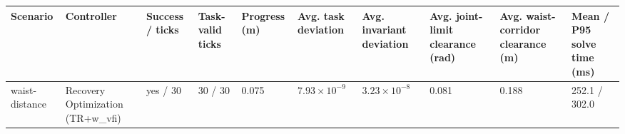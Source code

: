 \begin{tabular}{llllllllll}
\toprule
Scenario & Controller & Success / ticks & Task-valid ticks & Progress (m) & Avg. task deviation & Avg. invariant deviation & Avg. joint-limit clearance (rad) & Avg. waist-corridor clearance (m) & Mean / P95 solve time (ms) \\
\midrule
waist-distance & Recovery Optimization (TR+w\_vfi) & yes / 30 & 30 / 30 & 0.075 & $7.93\times 10^{-9}$ & $3.23\times 10^{-8}$ & 0.081 & 0.188 & 252.1 / 302.0 \\
\bottomrule
\end{tabular}
